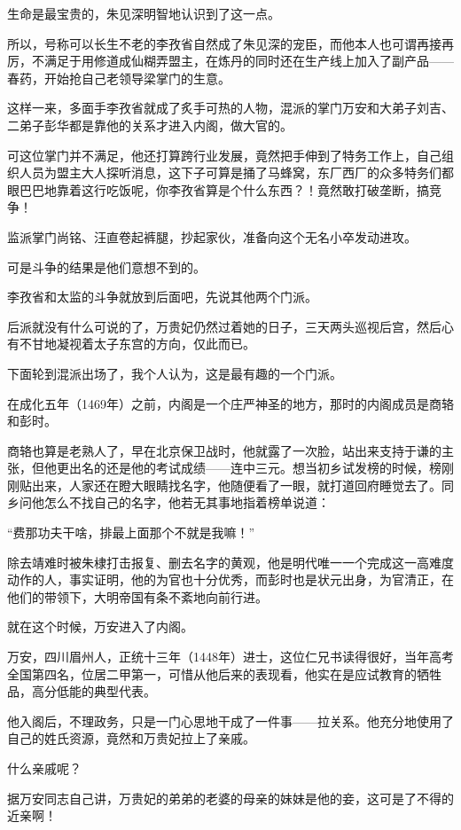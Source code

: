 \begin{multicols}{\theparacolNo}
		生命是最宝贵的，朱见深明智地认识到了这一点。

		所以，号称可以长生不老的李孜省自然成了朱见深的宠臣，而他本人也可谓再接再厉，不满足于用修道成仙糊弄盟主，在炼丹的同时还在生产线上加入了副产品——春药，开始抢自己老领导梁掌门的生意。

		这样一来，多面手李孜省就成了炙手可热的人物，混派的掌门万安和大弟子刘吉、二弟子彭华都是靠他的关系才进入内阁，做大官的。

		可这位掌门并不满足，他还打算跨行业发展，竟然把手伸到了特务工作上，自己组织人员为盟主大人探听消息，这下子可算是捅了马蜂窝，东厂西厂的众多特务们都眼巴巴地靠着这行吃饭呢，你李孜省算是个什么东西？！竟然敢打破垄断，搞竞争！

		监派掌门尚铭、汪直卷起裤腿，抄起家伙，准备向这个无名小卒发动进攻。

		可是斗争的结果是他们意想不到的。

		李孜省和太监的斗争就放到后面吧，先说其他两个门派。

		后派就没有什么可说的了，万贵妃仍然过着她的日子，三天两头巡视后宫，然后心有不甘地凝视着太子东宫的方向，仅此而已。

		下面轮到混派出场了，我个人认为，这是最有趣的一个门派。

		在成化五年（1469年）之前，内阁是一个庄严神圣的地方，那时的内阁成员是商辂和彭时。

		商辂也算是老熟人了，早在北京保卫战时，他就露了一次脸，站出来支持于谦的主张，但他更出名的还是他的考试成绩——连中三元。想当初乡试发榜的时候，榜刚刚贴出来，人家还在瞪大眼睛找名字，他随便看了一眼，就打道回府睡觉去了。同乡问他怎么不找自己的名字，他若无其事地指着榜单说道：

		“费那功夫干啥，排最上面那个不就是我嘛！”

		除去靖难时被朱棣打击报复、删去名字的黄观，他是明代唯一一个完成这一高难度动作的人，事实证明，他的为官也十分优秀，而彭时也是状元出身，为官清正，在他们的带领下，大明帝国有条不紊地向前行进。

		就在这个时候，万安进入了内阁。

		万安，四川眉州人，正统十三年（1448年）进士，这位仁兄书读得很好，当年高考全国第四名，位居二甲第一，可惜从他后来的表现看，他实在是应试教育的牺牲品，高分低能的典型代表。

		他入阁后，不理政务，只是一门心思地干成了一件事——拉关系。他充分地使用了自己的姓氏资源，竟然和万贵妃拉上了亲戚。

		什么亲戚呢？

		据万安同志自己讲，万贵妃的弟弟的老婆的母亲的妹妹是他的妾，这可是了不得的近亲啊！


\end{multicols}
